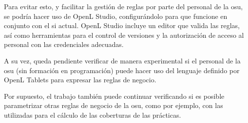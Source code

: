 Para evitar esto, y facilitar la gestión de reglas por parte del personal de la \acrshort{osu}, se podría hacer uso de OpenL Studio, configurándolo para que funcione en conjunto con el \acrshort{si} actual. 
OpenL Studio incluye un editor que valida las reglas, así como herramientas para el control de versiones y la autorización de acceso al personal con las credenciales adecuadas.

A su vez, queda pendiente verificar de manera experimental si el personal de la \acrshort{osu} (sin formación en programación) puede hacer uso del lenguaje definido por OpenL Tablets para expresar las reglas de negocio. 

Por supuesto, el trabajo también puede continuar verificando si es posible parametrizar otras reglas de negocio de la \acrshort{osu}, como por ejemplo, con las utilizadas para el cálculo de las coberturas de las prácticas.
